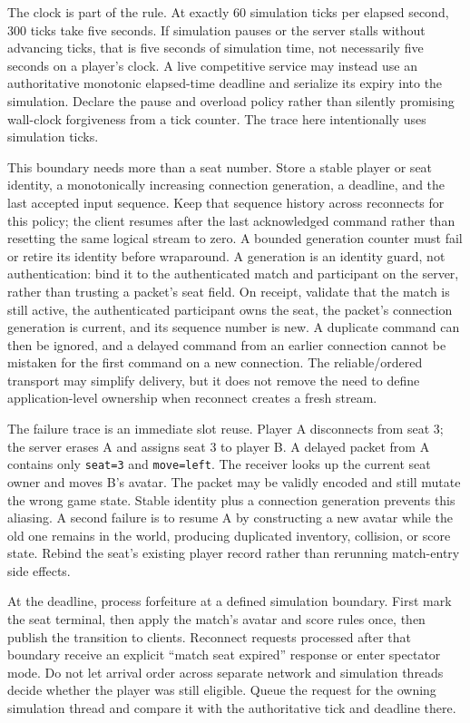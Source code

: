 The clock is part of the rule. At exactly 60 simulation ticks per elapsed second, 300 ticks take five seconds. If simulation pauses or the server stalls without advancing ticks, that is five seconds of simulation time, not necessarily five seconds on a player's clock. A live competitive service may instead use an authoritative monotonic elapsed-time deadline and serialize its expiry into the simulation. Declare the pause and overload policy rather than silently promising wall-clock forgiveness from a tick counter. The trace here intentionally uses simulation ticks.

This boundary needs more than a seat number. Store a stable player or seat identity, a monotonically increasing connection generation, a deadline, and the last accepted input sequence. Keep that sequence history across reconnects for this policy; the client resumes after the last acknowledged command rather than resetting the same logical stream to zero. A bounded generation counter must fail or retire its identity before wraparound. A generation is an identity guard, not authentication: bind it to the authenticated match and participant on the server, rather than trusting a packet's seat field. On receipt, validate that the match is still active, the authenticated participant owns the seat, the packet's connection generation is current, and its sequence number is new. A duplicate command can then be ignored, and a delayed command from an earlier connection cannot be mistaken for the first command on a new connection. The reliable/ordered transport may simplify delivery, but it does not remove the need to define application-level ownership when reconnect creates a fresh stream.

The failure trace is an immediate slot reuse. Player A disconnects from seat 3; the server erases A and assigns seat 3 to player B. A delayed packet from A contains only \texttt{seat=3} and \texttt{move=left}. The receiver looks up the current seat owner and moves B's avatar. The packet may be validly encoded and still mutate the wrong game state. Stable identity plus a connection generation prevents this aliasing. A second failure is to resume A by constructing a new avatar while the old one remains in the world, producing duplicated inventory, collision, or score state. Rebind the seat's existing player record rather than rerunning match-entry side effects.

At the deadline, process forfeiture at a defined simulation boundary. First mark the seat terminal, then apply the match's avatar and score rules once, then publish the transition to clients. Reconnect requests processed after that boundary receive an explicit ``match seat expired'' response or enter spectator mode. Do not let arrival order across separate network and simulation threads decide whether the player was still eligible. Queue the request for the owning simulation thread and compare it with the authoritative tick and deadline there.

